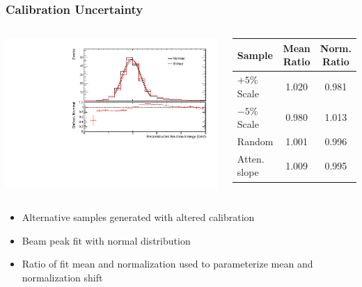 \documentclass[10pt,professionalfonts,xcolor=table]{beamer}
\begin{document}
\begin{frame}
\frametitle{Calibration Uncertainty}

\begin{columns}[c]



\includegraphics[angle=-90, width=1\textwidth]{figures/systs/params/fd_flat105cal.pdf}

\begin{center}
\begin{tabular}{|l|c|c|}
\hline
Sample & Mean Ratio & Norm. Ratio \\ \hline
$+5$\% Scale & 1.020 & 0.981 \\ \hline
$-5$\% Scale& 0.980 & 1.013 \\ \hline
Random & 1.001 & 0.996 \\ \hline
Atten. slope & 1.009 & 0.995 \\ \hline
\end{tabular}
\end{center}



\end{columns}

\begin{itemize}
\item Alternative samples generated with altered calibration
\item Beam peak fit with normal distribution
\item Ratio of fit mean and normalization used to parameterize mean and normalization shift
\end{itemize}
\end{frame}
\end{document}

